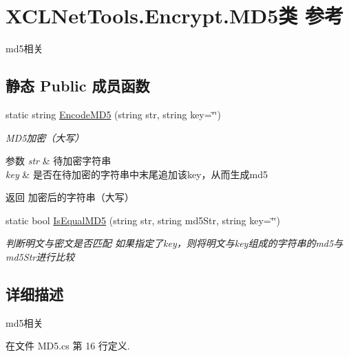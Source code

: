 \hypertarget{class_x_c_l_net_tools_1_1_encrypt_1_1_m_d5}{\section{X\-C\-L\-Net\-Tools.\-Encrypt.\-M\-D5类 参考}
\label{class_x_c_l_net_tools_1_1_encrypt_1_1_m_d5}
}


md5相关  


\subsection*{静态 Public 成员函数}
\begin{DoxyCompactItemize}
\item 
static string \hyperlink{class_x_c_l_net_tools_1_1_encrypt_1_1_m_d5_a146cf118c47e0693f82119d39f4b7ef1}{Encode\-M\-D5} (string str, string key=\char`\"{}\char`\"{})
\begin{DoxyCompactList}\small\item\em M\-D5加密（大写） 
\begin{DoxyParams}{参数}
{\em str} & 待加密字符串\\
\hline
{\em key} & 是否在待加密的字符串中末尾追加该key，从而生成md5\\
\hline
\end{DoxyParams}
\begin{DoxyReturn}{返回}
加密后的字符串（大写）
\end{DoxyReturn}
\end{DoxyCompactList}\item 
static bool \hyperlink{class_x_c_l_net_tools_1_1_encrypt_1_1_m_d5_a47f3bda0226d74bd2c9823a023ed8ed5}{Is\-Equal\-M\-D5} (string str, string md5\-Str, string key=\char`\"{}\char`\"{})
\begin{DoxyCompactList}\small\item\em 判断明文与密文是否匹配 如果指定了key，则将明文与key组成的字符串的md5与md5\-Str进行比较 \end{DoxyCompactList}\end{DoxyCompactItemize}


\subsection{详细描述}
md5相关 



在文件 M\-D5.\-cs 第 16 行定义.



